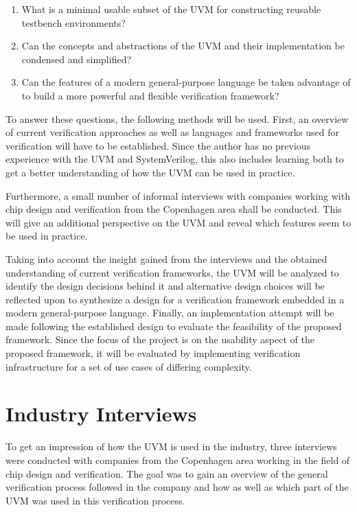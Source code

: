 \begin{enumerate}
  \item What is a minimal usable subset of the UVM for constructing reusable testbench environments?
  \item Can the concepts and abstractions of the UVM and their implementation be condensed and simplified?
  \item Can the features of a modern general-purpose language be taken advantage of to build a more powerful and
    flexible verification framework?
\end{enumerate}

To answer these questions, the following methods will be used. First, an overview of current verification approaches as well as languages and frameworks used for verification will have to be established. Since the author has no previous experience with the UVM and SystemVerilog, this also includes learning both to get a better understanding of how the UVM can be used in practice.

Furthermore, a small number of informal interviews with companies working with chip design and verification from the Copenhagen area shall be conducted. This will give an additional perspective on the UVM and reveal which features seem to be used in practice. 

Taking into account the insight gained from the interviews and the obtained understanding of current verification frameworks, the UVM will be analyzed to identify the design decisions behind it
and alternative design choices will be reflected upon to synthesize a design for a verification
framework embedded in a modern general-purpose language. Finally, an implementation attempt will be made following
the established design to evaluate the feasibility of the proposed framework. Since the focus of the project is on the usability aspect of the proposed framework, it will be evaluated by implementing verification infrastructure for a set of use cases of differing complexity. 

\chapter{Industry Interviews}

To get an impression of how the UVM is used in the industry, three interviews were conducted with companies from the Copenhagen area working in the field of chip design and verification. The goal was to gain an overview of the general verification process followed in the company and how as well as which part of the UVM was used in this verification process.

